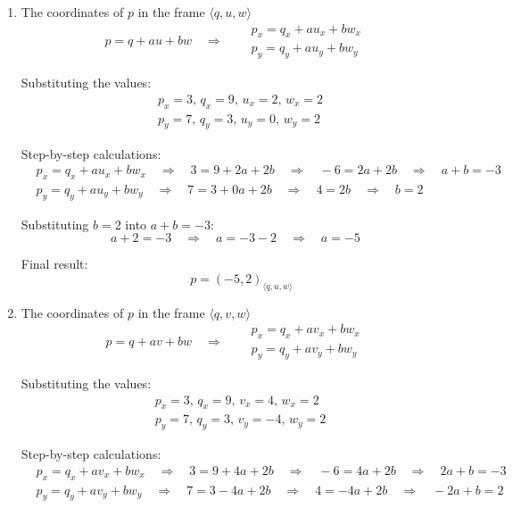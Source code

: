 \documentclass{article}
\begin{document}
\begin{enumerate}
\begin{enumerate}
      \item The coordinates of $p$ in the frame $\langle q, u, w\rangle$
\[
        p = q + a u + b w \quad \Rightarrow \quad 
        \begin{aligned}
            &p_x = q_x + a u_x + b w_x \\
            &p_y = q_y + a u_y + b w_y
        \end{aligned}
        \]

        Substituting the values:
\[
\begin{aligned}
    &p_x = 3, \, q_x = 9, \, u_x = 2, \, w_x = 2 \\
    &p_y = 7, \, q_y = 3, \, u_y = 0, \, w_y = 2
\end{aligned}
\]

Step-by-step calculations:
\[
\begin{aligned}
    &p_x = q_x + a u_x + b w_x \quad \Rightarrow \quad 3 = 9 + 2a + 2b \quad \Rightarrow \quad -6 = 2a + 2b \quad \Rightarrow \quad a + b = -3 \\
    &p_y = q_y + a u_y + b w_y \quad \Rightarrow \quad 7 = 3 + 0a + 2b \quad \Rightarrow \quad 4 = 2b \quad \Rightarrow \quad b = 2
\end{aligned}
\]

Substituting $b = 2$ into $a + b = -3$:
\[
a + 2 = -3 \quad \Rightarrow \quad a = -3 - 2 \quad \Rightarrow \quad a = -5
\]

Final result:
\[
\quad \boxed{p = (-5, 2)_{\langle q, u, w \rangle}}
\]

      \item The coordinates of $p$ in the frame $\langle q, v, w\rangle$
\[
        p = q + a v + b w \quad \Rightarrow \quad 
        \begin{aligned}
            &p_x = q_x + a v_x + b w_x \\
            &p_y = q_y + a v_y + b w_y
        \end{aligned}
        \]

        Substituting the values:
\[
\begin{aligned}
    &p_x = 3, \, q_x = 9, \, v_x = 4, \, w_x = 2 \\
    &p_y = 7, \, q_y = 3, \, v_y = -4, \, w_y = 2
\end{aligned}
\]

Step-by-step calculations:
\[
\begin{aligned}
    &p_x = q_x + a v_x + b w_x \quad \Rightarrow \quad 3 = 9 + 4a + 2b \quad \Rightarrow \quad -6 = 4a + 2b \quad \Rightarrow \quad 2a + b = -3 \\
    &p_y = q_y + a v_y + b w_y \quad \Rightarrow \quad 7 = 3 - 4a + 2b \quad \Rightarrow \quad 4 = -4a + 2b \quad \Rightarrow \quad -2a + b = 2
\end{aligned}
\]


\end{enumerate}
\end{enumerate}
\end{document}
